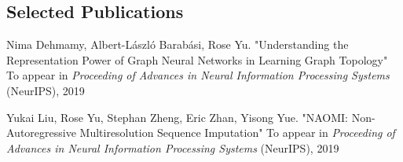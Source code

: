 \documentclass[margin,line]{res}
\begin{document}
\begin{resume}
%
%



%
%
%	
%	
%
%



\section{\sc Selected Publications}

\begin{enumerate}[label={[C\arabic*]}]
\item Nima Dehmamy, Albert-László Barabási, Rose Yu.  "Understanding the Representation Power of Graph Neural Networks in Learning Graph Topology" To appear in \textit{Proceeding of Advances in Neural Information Processing Systems} (NeurIPS), 2019
 
 
\item  Yukai Liu, Rose Yu, Stephan Zheng, Eric Zhan, Yisong Yue. "NAOMI: Non-Autoregressive Multiresolution Sequence Imputation" To appear in \textit{Proceeding of Advances in Neural Information Processing Systems} (NeurIPS), 2019



\end{enumerate}
\end{resume}
\end{document}
